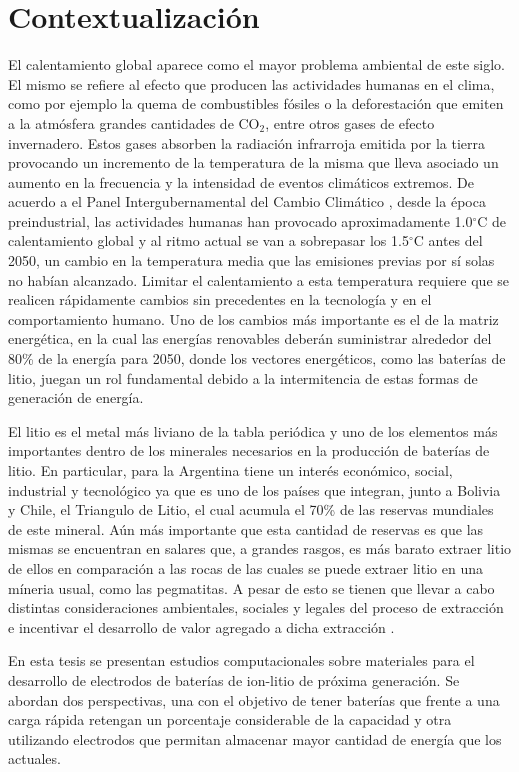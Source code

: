 \section{Contextualización}

El calentamiento global aparece como el mayor problema ambiental de este siglo.
El mismo se refiere al efecto que producen las actividades humanas en el clima, 
como por ejemplo la quema de combustibles fósiles o la deforestación que emiten 
a la atmósfera grandes cantidades de CO$_2$, entre otros gases de efecto 
invernadero. Estos gases absorben la radiación infrarroja emitida por la tierra 
provocando un incremento de la temperatura de la misma que lleva asociado un 
aumento en la frecuencia y la intensidad de eventos climáticos extremos. %
De acuerdo a el Panel Intergubernamental del Cambio Climático 
\cite{IPCC}, desde la época preindustrial, las actividades humanas han provocado 
aproximadamente 1.0$^{\circ}$C de calentamiento global y al ritmo actual se van 
a sobrepasar los 1.5$^{\circ}$C antes del 2050, un cambio en la temperatura
media que las emisiones previas por sí solas no habían alcanzado. Limitar el 
calentamiento a esta temperatura requiere que se realicen rápidamente cambios 
sin precedentes en la tecnología y en el comportamiento humano. Uno de los 
cambios más importante es el de la matriz energética, en la cual las energías 
renovables deberán suministrar alrededor del 80\% de la energía para 2050, donde 
los vectores energéticos, como las baterías de litio, juegan un rol fundamental 
debido a la intermitencia de estas formas de generación de energía.

El litio es el metal más liviano de la tabla periódica y uno de los elementos más
importantes dentro de los minerales necesarios en la producción de baterías de
litio. En particular, para la Argentina tiene un interés económico, social, 
industrial y tecnológico ya que es uno de los países que integran, junto a 
Bolivia y Chile, el Triangulo de Litio, el cual acumula el 70\% de las reservas 
mundiales de este mineral. Aún más importante que esta cantidad de reservas es 
que las mismas se encuentran en salares que, a grandes rasgos, es más barato
extraer litio de ellos en comparación a las rocas de las cuales se puede extraer 
litio en una míneria usual, como las pegmatitas. A pesar de esto se tienen que
llevar a cabo distintas consideraciones ambientales, sociales y legales del 
proceso de extracción e incentivar el desarrollo de valor agregado a dicha 
extracción \cite{gutierrez2022, petavratzi2022, obaya2021, romero2021, 
heredia2020, fornillo2019}.

En esta tesis se presentan estudios computacionales sobre materiales para el 
desarrollo de electrodos de baterías de ion-litio de próxima generación. Se 
abordan dos perspectivas, una con el objetivo de tener baterías que frente a una 
carga rápida retengan un porcentaje considerable de la capacidad y otra 
utilizando electrodos que permitan almacenar mayor cantidad de energía que los 
actuales.
